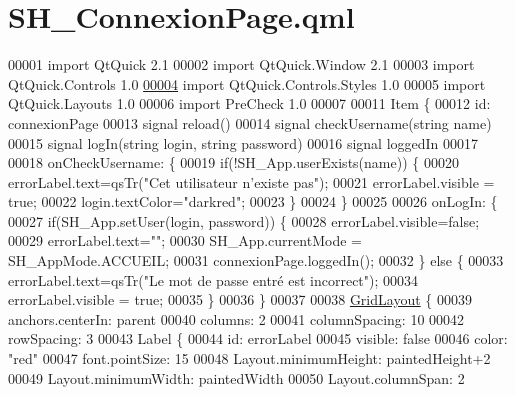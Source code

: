 \hypertarget{SH__ConnexionPage_8qml}{\section{S\-H\-\_\-\-Connexion\-Page.\-qml}
\label{SH__ConnexionPage_8qml}
}

\begin{DoxyCode}
00001 \textcolor{keyword}{import} QtQuick 2.1
00002 import QtQuick.Window 2.1
00003 import QtQuick.Controls 1.0
\hypertarget{SH__ConnexionPage_8qml_source_l00004}{}\hyperlink{classSH__ConnexionPage}{00004} import QtQuick.Controls.Styles 1.0
00005 import QtQuick.Layouts 1.0
00006 import PreCheck 1.0
00007 
00011 Item \{
00012     \textcolor{keywordtype}{id}: connexionPage
00013     signal reload()
00014     signal checkUsername(\textcolor{keywordtype}{string} name)
00015     signal logIn(\textcolor{keywordtype}{string} login, \textcolor{keywordtype}{string} password)
00016     signal loggedIn
00017 
00018     onCheckUsername: \{
00019         \textcolor{keywordflow}{if}(!SH\_App.userExists(name)) \{
00020             errorLabel.text=qsTr(\textcolor{stringliteral}{"Cet utilisateur n'existe pas"});
00021             errorLabel.visible = \textcolor{keyword}{true};
00022             login.textColor=\textcolor{stringliteral}{"darkred"};
00023         \}
00024     \}
00025 
00026     onLogIn: \{
00027         \textcolor{keywordflow}{if}(SH\_App.setUser(login, password)) \{
00028             errorLabel.visible=\textcolor{keyword}{false};
00029             errorLabel.text=\textcolor{stringliteral}{""};
00030             SH\_App.currentMode = SH\_AppMode.ACCUEIL;
00031             connexionPage.loggedIn();
00032         \} \textcolor{keywordflow}{else} \{
00033             errorLabel.text=qsTr(\textcolor{stringliteral}{"Le mot de passe entré est incorrect"});
00034             errorLabel.visible = \textcolor{keyword}{true};
00035         \}
00036     \}
00037 
00038     \hyperlink{classGridLayout}{GridLayout} \{
00039         anchors.centerIn: parent
00040         columns: 2
00041         columnSpacing: 10
00042         rowSpacing: 3
00043         Label \{
00044             \textcolor{keywordtype}{id}: errorLabel
00045             visible: \textcolor{keyword}{false}
00046             color: \textcolor{stringliteral}{"red"}
00047             font.pointSize: 15
00048             Layout.minimumHeight: paintedHeight+2
00049             Layout.minimumWidth: paintedWidth
00050             Layout.columnSpan: 2

\end{DoxyCode}
